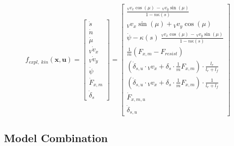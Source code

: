 \documentclass[
a4paper, %
10pt, %
notitlepage,
english]{CSUniSchoolLabReport}
\begin{document}
\begin{equation}
	f_{expl,\;kin}(\mathbf{x}, \mathbf{u}) =
	\left[\begin{array}{c}

		\dot{s} \\

		\dot{n} \\

		\dot{\mu} \\

		{}_V\dot{v}_x \\

		{}_V\dot{v}_y \\

		\ddot{\psi}\;\;\; \\

		\dot{F}_{x,m} \\

		\dot{\delta}_s

	\end{array}\right] =
	\left[\begin{array}{c}

		\frac{{}_V v_x \cos(\mu) \,-\, {}_V v_y \sin(\mu)}{1 - n \kappa(s)} \\

		{}_V v_x \sin(\mu) + {}_V v_y \cos(\mu) \\

		\dot{\psi} - \kappa(s)\;\frac{{}_V v_x \cos(\mu) \,-\, {}_V v_y \sin(\mu)}{1 - n \kappa(s)} \\

		\frac{1}{m}  \left( F_{x, m} - F_{resist} \right)\\

		\left( \dot{\delta}_{s,u} \cdot {}_Vv_x + \delta_s \cdot \frac{1}{m} F_{x, m}  \right) \cdot  \frac{l_r}{l_r+l_f}\\

		\left( \dot{\delta}_{s,u} \cdot {}_Vv_x + \delta_s \cdot \frac{1}{m} F_{x, m} \right) \cdot  \frac{1}{l_r+l_f} \\

		\dot{F}_{x,m,u} \\

		\dot{\delta}_{s,u}
	\end{array}\right]
\end{equation}


\subsection{Model Combination}
\end{document}
